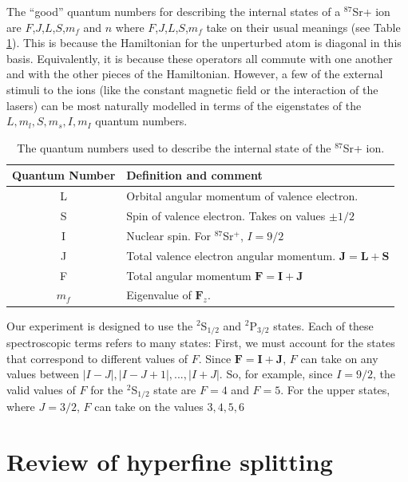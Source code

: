 The ``good'' quantum numbers for describing the internal states of a $^{87}$Sr+ ion are $F$,$J$,$L$,$S$,$m_f$ and $n$\cite{experimental_hyperfine_alkali_arimondo}\cite{cuaMITnotes} where $F$,$J$,$L$,$S$,$m_f$ take on their usual meanings (see Table\,\ref{quantumNumberQuickref}). This is because the Hamiltonian for the unperturbed atom is diagonal in this basis. Equivalently, it is because these operators all commute with one another and with the other pieces of the Hamiltonian. However, a few of the external stimuli to the ions (like the constant magnetic field or the interaction of the lasers) can be most naturally modelled in terms of the eigenstates of the $L,m_l,S,m_s,I,m_I$ quantum numbers.   

\begin{table}[h!]
\centering
\begin{tabular}{|c|l|}
\hline
Quantum Number & Definition and comment \\ \hline \hline
L & Orbital angular momentum of valence electron. \\ \hline
S & Spin of valence electron. Takes on values $\pm 1/2$ \\ \hline
I & Nuclear spin. For $^{87}$Sr$^+$, $I=9/2$ \\ \hline
J & Total valence electron angular momentum. $\mathbf{J}=\mathbf{L}+\mathbf{S}$ \\ \hline
F & Total angular momentum $\mathbf{F}=\mathbf{I}+\mathbf{J}$ \\ \hline
$m_f$ & Eigenvalue of $\mathbf{F}_z$.\\ \hline
\end{tabular}
\caption{The quantum numbers used to describe the internal state of the $^{87}$Sr+ ion.}
\label{quantumNumberQuickref}
\end{table}

Our experiment is designed to use the $^2$S$_{1/2}$ and $^2$P$_{3/2}$ states. Each of these spectroscopic terms refers to many states: First, we must account for the states that correspond to different values of $F$. Since $\mathbf{F}=\mathbf{I}+\mathbf{J}$, $F$ can take on any values between $|I-J|,|I-J+1|,...,|I+J|$. So, for example, since $I=9/2$, the valid values of $F$ for the $^2$S$_{1/2}$ state are $F=4$ and $F=5$. For the upper states, where $J=3/2$, $F$ can take on the values $3,4,5,6$ 

\section{Review of hyperfine splitting}

